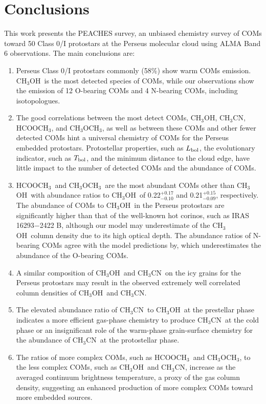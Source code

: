 \documentclass[twocolumn]{aastex62}
\newcommand{\lbol}{\mbox{$L_{\rm bol}$}}
\newcommand{\tbol}{\mbox{$T_{\rm bol}$}}
\newcommand{\methylformate}{\mbox{HCOOCH$_{3}$}}
\newcommand{\methanol}{\mbox{CH$_{3}$OH}}
\newcommand{\dimethylether}{\mbox{CH$_{3}$OCH$_{3}$}}
\newcommand{\methylcyanide}{\mbox{CH$_{3}$CN}}
\begin{document}
\section{Conclusions}
\label{sec:conclusions}
This work presents the PEACHES survey, an unbiased chemistry survey of COMs toward 50 Class 0/I protostars at the Perseus molecular cloud using ALMA Band 6 observations.  The main conclusions are:

\begin{enumerate}
  \item Perseus Class 0/I protostars commonly (58\%) show warm COMs emission.  \methanol\ is the most detected species of COMs, while our observations show the emission of 12 O-bearing COMs and 4 N-bearing COMs, including isotopologues.
  \item The good correlations between the most detect COMs, \methanol, \methylcyanide, \methylformate, and \dimethylether, as well as between these COMs and other fewer detected COMs hint a universal chemistry of COMs for the Perseus embedded protostars.  Protostellar properties, such as \lbol, the evolutionary indicator, such as \tbol, and the minimum distance to the cloud edge, have little impact to the number of detected COMs and the abundance of COMs.
  \item \methylformate\ and \dimethylether\ are the most abundant COMs other than \methanol\ with abundance ratios to \methanol\ of 0.22$^{+0.17}_{-0.10}$ and 0.21$^{+0.15}_{-0.09}$, respectively.  The abundance of COMs to \methanol\ in the Perseus protostars are significantly higher than that of the well-known hot corinos, such as IRAS 16293$-$2422 B, although our model may underestimate of the \methanol\ column density due to its high optical depth.  The abundance ratios of N-bearing COMs agree with the model predictions by\citet{2013ApJ...765...60G}, which underestimates the abundance of the O-bearing COMs.
  \item A similar composition of \methanol\ and \methylcyanide\ on the icy grains for the Perseus protostars may result in the observed extremely well correlated column densities of \methanol\ and \methylcyanide.  
  \item The elevated abundance ratio of \methylcyanide\ to \methanol\ at the prestellar phase indicates a more efficient gas-phase chemistry to produce \methylcyanide\ at the cold phase or an insignificant role of the warm-phase grain-surface chemistry for the abundance of \methylcyanide\ at the protostellar phase.
  \item The ratios of more complex COMs, such as \methylformate\ and \dimethylether, to the less complex COMs, such as \methanol\ and \methylcyanide, increase as the averaged continuum brightness temperature, a proxy of the gas column density, suggesting an enhanced production of more complex COMs toward more embedded sources.
\end{enumerate}
\end{document}
